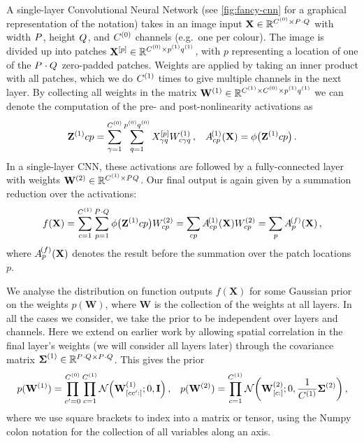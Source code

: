 \documentclass{article}
\theoremstyle{definition}
\newcommand{\vX}{\mathbf{X}}
\newcommand{\vW}{\mathbf{W}}
\newcommand{\eye}{\mathbf{I}}
\begin{document}
\newcommand{\convpatch}[2]{{#1}^{[#2]}}
A single-layer Convolutional Neural Network (see \cref{fig:fancy-cnn} for a graphical representation of the notation) takes in an image input $\vX \in \Reals^{\layerC{0}\times \layersize{}}$ with width $P^{}$, height $Q^{}$, and $C^{(0)}$ channels (e.g.~one per colour). The image is divided up into patches $\convpatch{\vX}{p} \in \Reals^{\layerC{0}\times\patchw{1}\patchh{1}}$, with $p$ representing a location of one of the $P^{}\cdot Q^{}$ zero-padded patches. Weights are applied by taking an inner product with all patches, which we do $C^{(1)}$ times to give multiple channels in the next layer. By collecting all weights in the matrix $\layerW{1}\in\Reals^{\layerC1\times \layerC0\times \patchw1\patchh1}$ we can denote the computation of the pre- and post-nonlinearity activations as
\begin{align}
    \layerAs{1}{cp} = \sum_{\gamma=1}^{\layerC0}\sum_{q=1}^{\patchw0\patchh0} \convpatch{X}{p}_{\gamma q} \layerWs1_{c\gamma q} \,, && \layerNLAs{(1)}{cp} = \phi\big(\layerAs{1}{cp}\big)\,.
\end{align}
In a single-layer CNN, these activations are followed by a fully-connected layer with weights $\layerW{2} \in \Reals^{\layerC 1\times \layerw{}\layerh{}}$. Our final output is again given by a summation reduction over the activations:
\begin{align}
    f(\vX) = \sum_{c=1}^{\layerC1}\sum_{p=1}^{\layersize{}} \phi\big(\layerAs{1}{cp}\big) W^{(2)}_{cp} = \sum_{cp} \layerNLAs{(1)}{cp}\layerWs{2}_{cp} = \sum_p \layerNLAs{(f)}{p} \label{eq:single-layer-f} \,,
\end{align}
where $\layerNLAs{(f)}{p}$ denotes the result before the summation over the patch locations $p$. 

We analyse the distribution on function outputs $f(\vX)$ for some Gaussian prior on the weights $p(\vW)$, where $\vW$ is the collection of the weights at all layers. In all the cases we consider, we take the prior to be independent over layers and channels. Here we extend on earlier work by allowing spatial correlation in the final layer's weights (we will consider all layers later) through the covariance matrix $\boldsymbol{\Sigma}^{(1)} \in \mathbb{R}^{P^{}\cdot Q^{}\times P^{}\cdot Q^{}}$. This gives the prior
\begin{align}
    p(\layerW1) = \prod_{c'=0}^{\layerC0}\prod_{c=1}^{\layerC1}\NormDist{\layerW1_{[cc':]}; 0, \eye} \,,
    && p(\layerW2) = \prod_{c=1}^{\layerC1} \NormDist{\layerW2_{[c:]}; 0, \frac{1}{\layerC1}\priorWcov2} \,,
\end{align}
where we use square brackets to index into a matrix or tensor, using the Numpy colon notation for the collection of all variables along an axis.
\end{document}
